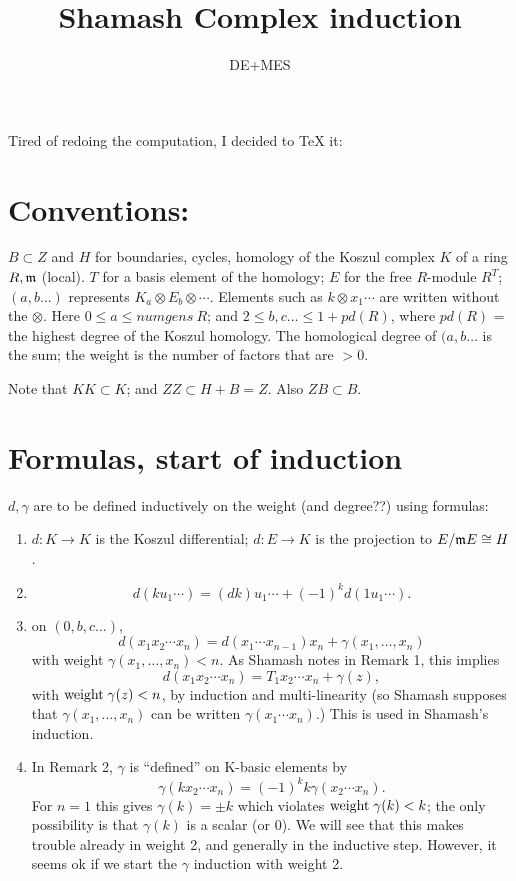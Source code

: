 \documentclass[11pt]{amsart}
\title{Shamash Complex induction}
\author{DE+MES}
\def\g{{\gamma}}
\def\mm{{\frak m}}
\def\w{{\rm weight}}
\begin{document}
\maketitle
Tired of redoing the computation, I decided to TeX it:

\section{Conventions:} $B\subset Z$ and  $H$ for boundaries, cycles, homology of the Koszul complex $K$ of a  ring $R,\mm$ (local). $T$ for a basis element of the homology; $E$ for the free $R$-module $R^T$; 
$(a,b...)$ represents $K_a\otimes E_b\otimes \cdots$. Elements such as $k\otimes x_1\cdots$ are written without the $\otimes$.
Here $0\leq a\leq numgens\ R$; and $2\leq b,c\dots\leq 1+pd(R)$, where $pd(R)$ = the highest degree of the Koszul homology. The homological degree of $(a,b\dots$ is the sum; the weight is the
number of factors that are $>0$.

Note that $KK \subset K$; and $ZZ\subset H+B = Z$. Also $ZB\subset B$.

\section{Formulas, start of induction}
$d,\g$ are to be defined inductively on the weight (and degree??) using formulas:

\begin{enumerate}
\item \label{(1)} $d:K\to K$ is the Koszul differential; $d: E \to K$ is the projection to $E/\mm E \cong H$.
\item \label{(2)}
$$
d(ku_1\cdots) = (dk)u_1\cdots +(-1)^kd(1u_1\cdots).
$$
\item\label{(3)}
on $(0,b,c\dots)$, 
$$
d(x_1x_2\cdots x_n) = d(x_1\cdots x_{n-1})x_n+\g(x_1,\dots, x_n)
$$
with weight $\g(x_1,\dots, x_n)<n$. As Shamash notes in Remark 1,  this implies
$$
d(x_1x_2\cdots x_n) = T_{1}x_{2}\cdots x_n+\g(z),
$$
with $\w\;\g(z)<n$, by induction and multi-linearity (so Shamash  supposes that $\g(x_{1}, \dots, x_{n})$ can be written $\g(x_{1}\cdots x_{n})$.) This is used in Shamash's induction.

\item\label{(4)} In Remark 2, $\g$ is ``defined'' on K-basic elements by 
$$
\g(kx_{2}\cdots x_{n}) = (-1)^{k}k\g(x_{2}\cdots x_{n}).
$$
For $n=1$ this gives $\g(k) = \pm k$ which violates $\w\; \g(k)<k$; the only possibility is that $\g(k)$ is
a scalar (or 0). We will see that this makes trouble already in weight 2, and generally in the inductive step.
However, it seems ok if we start the $\gamma$ induction with weight 2.
\end{enumerate}
\end{document}
